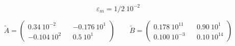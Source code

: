 \[ \varepsilon_m=1/2 \ 10^{-2} \]

\medskip
\[
 \widetilde A=\left(
\begin{array}{ccc}
0.34\ 10^{-2} && -0.176\ 10^1 \\
-0.104\ 10^{2} && 0.5\ 10^{1}
\end{array} \right) \quad \quad
 \widetilde B=\left(
\begin{array}{ccc}
0.178\ 10^{11} & & 0.90\ 10^1 \\
0.100\ 10^{-3} &  & 0.10\ 10^{14}
\end{array}
\right)
\]

